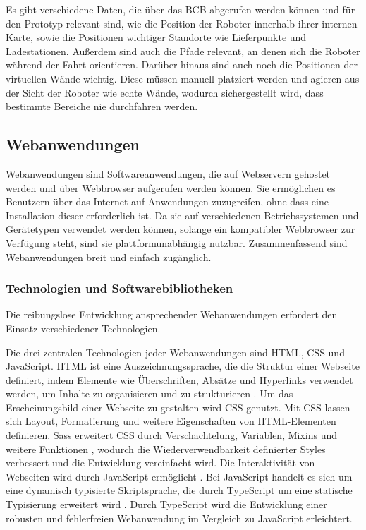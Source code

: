 Es gibt verschiedene Daten, die über das \ac{BCB} abgerufen werden können und für den Prototyp relevant sind, wie die Position der Roboter innerhalb ihrer internen Karte, sowie die Positionen wichtiger Standorte wie Lieferpunkte und Ladestationen. Außerdem sind auch die Pfade relevant, an denen sich die Roboter während der Fahrt orientieren. Darüber hinaus sind auch noch die Positionen der virtuellen Wände wichtig. Diese müssen manuell platziert werden und agieren aus der Sicht der Roboter wie echte Wände, wodurch sichergestellt wird, dass bestimmte Bereiche nie durchfahren werden.

\subsection{Webanwendungen}
Webanwendungen sind Softwareanwendungen, die auf Webservern gehostet werden und über Webbrowser aufgerufen werden können. Sie ermöglichen es Benutzern über das Internet auf Anwendungen zuzugreifen, ohne dass eine Installation dieser erforderlich ist. Da sie auf verschiedenen Betriebssystemen und Gerätetypen verwendet werden können, solange ein kompatibler Webbrowser zur Verfügung steht, sind sie plattformunabhängig nutzbar.\cite{AWSWebApp} Zusammenfassend sind Webanwendungen breit und einfach zugänglich.

\subsubsection{Technologien und Softwarebibliotheken}\label{sec:WebTechnologies}
Die reibungslose Entwicklung ansprechender Webanwendungen erfordert den Einsatz verschiedener Technologien.

Die drei zentralen Technologien jeder Webanwendungen sind \ac{HTML}, \ac{CSS} und JavaScript. \ac{HTML} ist eine Auszeichnungssprache, die die Struktur einer Webseite definiert, indem Elemente wie Überschriften, Absätze und Hyperlinks verwendet werden, um Inhalte zu organisieren und zu strukturieren \cite{HTML}. Um das Erscheinungsbild einer Webseite zu gestalten wird \ac{CSS} genutzt. Mit \ac{CSS} lassen sich Layout, Formatierung und weitere Eigenschaften von \ac{HTML}-Elementen definieren.\cite{CSS} \ac{Sass} erweitert \ac{CSS} durch Verschachtelung, Variablen, \gls{Mixins} und weitere Funktionen \cite{Sass}, wodurch die Wiederverwendbarkeit definierter Styles verbessert und die Entwicklung vereinfacht wird. Die Interaktivität von Webseiten wird durch JavaScript ermöglicht \cite{JavaScript}. Bei JavaScript handelt es sich um eine dynamisch typisierte Skriptsprache, die durch TypeScript um eine statische Typisierung erweitert wird \cite{TypeScript}. Durch TypeScript wird die Entwicklung einer robusten und fehlerfreien Webanwendung im Vergleich zu JavaScript erleichtert.


